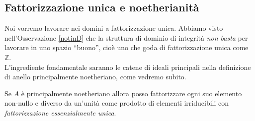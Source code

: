 \subsection{Fattorizzazione unica e noetherianità}
\begin{osservazione}
	Noi vorremo lavorare nei domini a fattorizzazione unica. Abbiamo visto nell'Osservazione \ref{notinD} che la struttura di dominio di integrità \textit{non basta} per lavorare in uno spazio \enquote{buono}, cioè uno che goda di fattorizzazione unica come $\mathbb{Z}$. \\ L'ingrediente fondamentale saranno le catene di ideali principali nella definizione di anello principalmente noetheriano, come vedremo subito.
\end{osservazione}
\begin{teorema}
	Se $A$ è principalmente noetheriano allora posso fattorizzare ogni suo elemento non-nullo e diverso da un'unità come prodotto di elementi irriducibili con \textit{fattorizzazione essenzialmente unica}.
\end{teorema}
